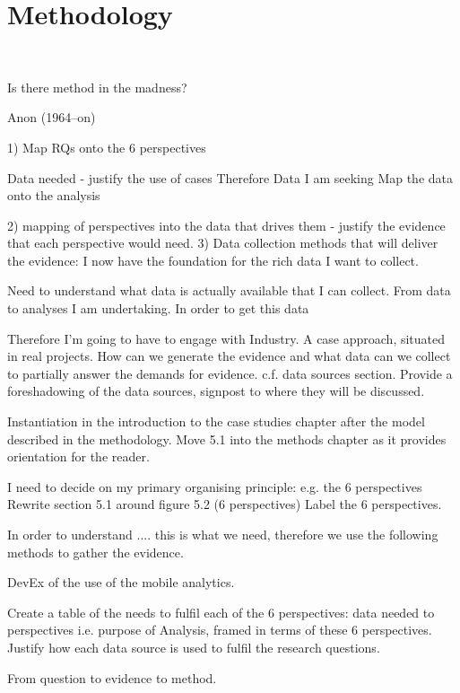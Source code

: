 \chapter{Methodology}~\label{chapter-methodology}
\epigraph{Is there method in the madness?}{Anon (1964--on)}


1) Map RQs onto the 6 perspectives

Data needed - justify the use of cases
Therefore 
Data I am seeking
Map the data onto the analysis

2) mapping of perspectives into the data that drives them - justify the evidence that each perspective would need.
3) Data collection methods that will deliver the evidence: I now have the foundation for the rich data I want to collect.

Need to understand what data is actually available that I can collect.
From data to analyses I am undertaking.
In order to get this data 

Therefore I'm going to have to engage with Industry. A case approach, situated in real projects.
How can we generate the evidence and what data can we collect to partially answer the demands for evidence. c.f. data sources section. Provide a foreshadowing of the data sources, signpost to where they will be discussed.

Instantiation in the introduction to the case studies chapter after the model described in the methodology.
Move 5.1 into the methods chapter as it provides orientation for the reader.

I need to decide on my primary organising principle: e.g. the 6 perspectives
Rewrite section 5.1 around figure 5.2 (6 perspectives) Label the 6 perspectives.

In order to understand .... this is what we need, therefore we use the following methods to gather the evidence.

DevEx of the use of the mobile analytics. 

Create a table of the needs to fulfil each of the 6 perspectives: data needed to perspectives i.e. purpose of Analysis, framed in terms of these 6 perspectives. 
Justify how each data source is used to fulfil the research questions. 

From question to evidence to method.

